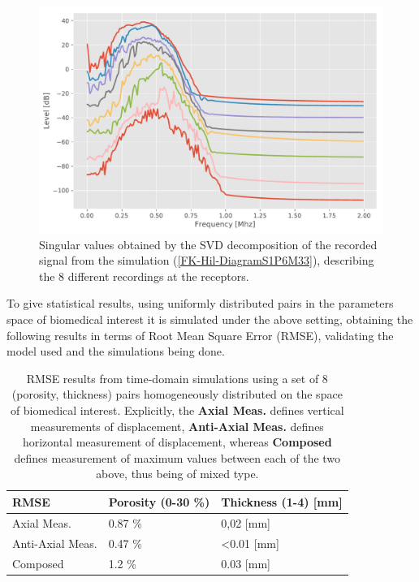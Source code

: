 \begin{figure}[!h]  
	\centering
	\includegraphics[scale=.5]{images/TimeSingSous/2DTimeHilb_P6Elastic33_SV.pdf}
	\caption{Singular values obtained by the SVD decomposition of the recorded signal from the simulation (\ref{FK-Hil-DiagramS1P6M33}), describing the 8 different recordings at the receptors.}
	\label{SVD-Hil-S1P7M33}
\end{figure}

To give statistical results, using uniformly distributed pairs in the parameters space of biomedical interest it is simulated under the above setting, obtaining the following results in terms of Root Mean Square Error (RMSE), validating the model used and the simulations being done.

\begin{table}[!h]
\centering
    \begin{tabular}{l l l}
    \toprule
    \textbf{RMSE} & \textbf{Porosity} (0-30 \%) & \textbf{Thickness} (1-4) [mm]\\
    \midrule
    Axial Meas. & 0.87 \% & 0,02  [mm]\\
    Anti-Axial Meas. & 0.47 \%  & <0.01 [mm]\\
    Composed & 1.2 \% & 0.03 [mm] \\
    \bottomrule
    \end{tabular}
    \caption{RMSE results from time-domain simulations using a set of 8 (porosity, thickness) pairs homogeneously distributed on the space of biomedical interest. Explicitly, the \textbf{Axial Meas.} defines vertical measurements of displacement, \textbf{Anti-Axial Meas.} defines horizontal measurement of displacement, whereas \textbf{Composed} defines measurement of maximum values between each of the two above, thus being of mixed type.} 
    \label{TimeInvTable}
\end{table}

